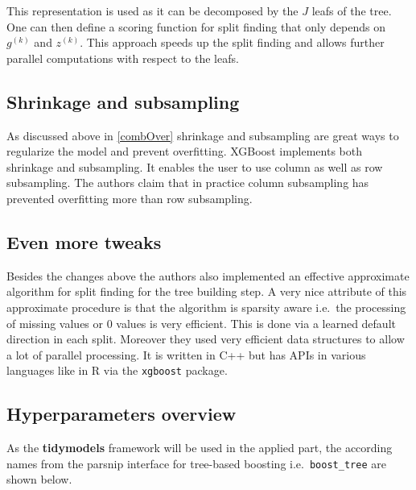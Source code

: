 \documentclass[
]{book}
\begin{document}
This representation is used as it can be decomposed by the \(J\) leafs of the tree. One can then define a scoring function for split finding that only depends on \(g^{(k)}\) and \(z^{(k)}\). This approach speeds up the split finding and allows further parallel computations with respect to the leafs.

\hypertarget{shrinkage-and-subsampling}{%
\subsection{Shrinkage and subsampling}\label{shrinkage-and-subsampling}}

As discussed above in \ref{combOver} shrinkage and subsampling are great ways to regularize the model and prevent overfitting. XGBoost implements both shrinkage and subsampling. It enables the user to use column as well as row subsampling. The authors claim that in practice column subsampling has prevented overfitting more than row subsampling.\citep{xgboostPaper}

\hypertarget{even-more-tweaks}{%
\subsection{Even more tweaks}\label{even-more-tweaks}}

Besides the changes above the authors also implemented an effective approximate algorithm for split finding for the tree building step. A very nice attribute of this approximate procedure is that the algorithm is sparsity aware i.e.~the processing of missing values or 0 values is very efficient. This is done via a learned default direction in each split. Moreover they used very efficient data structures to allow a lot of parallel processing.\citep{xgboostPaper} It is written in C++ but has APIs in various languages like in R via the \texttt{xgboost} package.\citep{xgboost_package}

\hypertarget{hyperparameters-overview}{%
\subsection{Hyperparameters overview}\label{hyperparameters-overview}}

As the \textbf{tidymodels} framework will be used in the applied part, the according names from the parsnip interface for tree-based boosting i.e.~\texttt{boost\_tree} are shown below.\citep[\citet{xgboost_package}, \citet{tidymodels}]{xgboostPaper}
\end{document}
